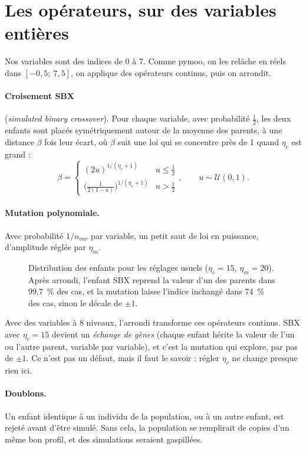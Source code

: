 \section{Les opérateurs, sur des variables entières}
Nos variables sont des indices de 0 à 7. Comme pymoo, on les relâche en réels dans $[-0{,}5;\ 7{,}5]$, on applique des opérateurs continus, puis on arrondit.

\paragraph{Croisement SBX} (\emph{simulated binary crossover}). Pour chaque variable, avec probabilité $\frac12$, les deux enfants sont placés symétriquement autour de la moyenne des parents, à une distance $\beta$ fois leur écart, où $\beta$ suit une loi qui se concentre près de 1 quand $\eta_c$ est grand :
\[
\beta=\begin{cases}(2u)^{1/(\eta_c+1)} & u\le\frac12\\ \big(\frac{1}{2(1-u)}\big)^{1/(\eta_c+1)} & u>\frac12\end{cases},\qquad u\sim\mathcal U(0,1).
\]
\paragraph{Mutation polynomiale.} Avec probabilité $1/n_{var}$ par variable, un petit saut de loi en puissance, d'amplitude réglée par $\eta_m$.

\begin{figure}[htbp]
\centering

\caption{Distribution des enfants pour les réglages usuels ($\eta_c=15$, $\eta_m=20$). Après arrondi, l'enfant SBX reprend la valeur d'un des parents dans 99,7~\% des cas, et la mutation laisse l'indice inchangé dans 74~\% des cas, sinon le décale de $\pm1$.}\label{fig:operateurs}
\end{figure}

\begin{piege}
Avec des variables à 8 niveaux, l'arrondi transforme ces opérateurs continus. SBX avec $\eta_c=15$ devient un \emph{échange de gènes} (chaque enfant hérite la valeur de l'un ou l'autre parent, variable par variable), et c'est la mutation qui explore, par pas de $\pm1$. Ce n'est pas un défaut, mais il faut le savoir : régler $\eta_c$ ne change presque rien ici.
\end{piege}

\paragraph{Doublons.} Un enfant identique à un individu de la population, ou à un autre enfant, est rejeté avant d'être simulé. Sans cela, la population se remplirait de copies d'un même bon profil, et des simulations seraient gaspillées.

